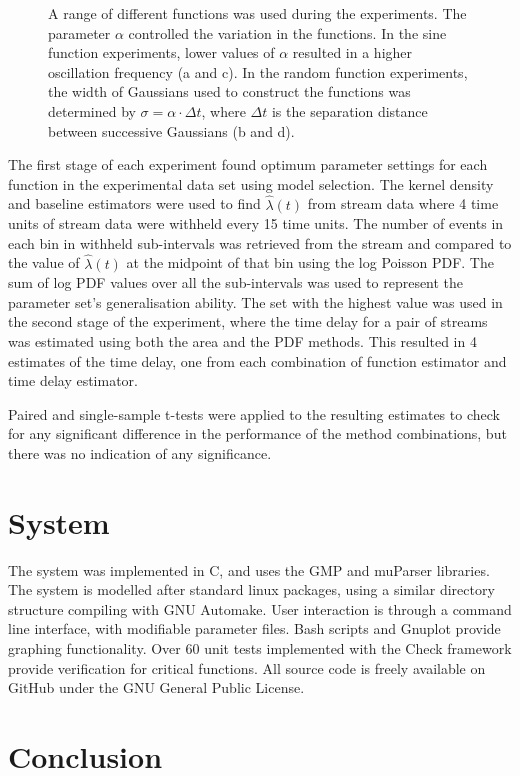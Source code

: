 \documentclass[a4paper,11pt]{article}
\begin{document}
\begin{figure}[h]
\caption{A range of different functions was used during the experiments. The
parameter $\alpha$ controlled the variation in the functions. In the sine
function experiments, lower values of $\alpha$ resulted in a higher oscillation
frequency (a and c). In the random function experiments, the width of Gaussians
used to construct the functions was determined by $\sigma=\alpha\cdot\Delta t$,
where $\Delta t$ is the separation distance between successive Gaussians (b and
d).}

\end{figure}
  The first stage of each experiment found optimum parameter settings for each
  function in the experimental data set using model selection. The kernel
  density and baseline estimators were used to find $\hat{\lambda}(t)$ from
  stream data where 4 time units of stream data were withheld every 15 time
  units. The number of events in each bin in withheld sub-intervals was
  retrieved from the stream and compared to the value of $\hat{\lambda}(t)$ at
  the midpoint of that bin using the log Poisson PDF. The sum of log PDF values
  over all the sub-intervals was used to represent the parameter set's
  generalisation ability. The set with the highest value was used in the second
  stage of the experiment, where the time delay for a pair of streams was
  estimated using both the area and the PDF methods. This resulted in 4
  estimates of the time delay, one from each combination of function estimator
  and time delay estimator.

  Paired and single-sample t-tests were applied to the resulting estimates to
  check for any significant difference in the performance of the method
  combinations, but there was no indication of any significance.
\section{System}
\label{sec-6}

  The system was implemented in C, and uses the GMP and muParser libraries. The
  system is modelled after standard linux packages, using a similar directory
  structure compiling with GNU Automake. User interaction is through a command
  line interface, with modifiable parameter files. Bash scripts and Gnuplot
  provide graphing functionality. Over 60 unit tests implemented with the Check
  framework provide verification for critical functions. All source code is
  freely available on GitHub \cite{repo} under the GNU General Public License.
\section{Conclusion}
\label{sec-7}
\end{document}
